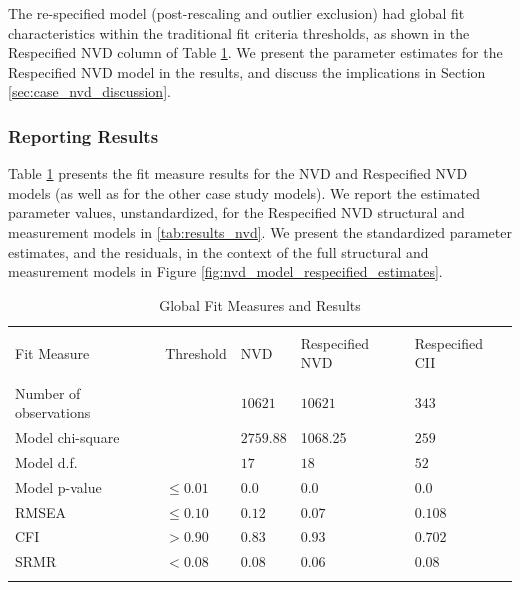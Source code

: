 The re-specified model (post-rescaling and outlier exclusion) had global fit characteristics within the traditional fit criteria thresholds, as shown in the Respecified NVD column of Table \ref{tab:results_fit_all}. We present the parameter estimates for the Respecified NVD model in the results, and discuss the implications in Section \ref{sec:case_nvd_discussion}.

\subsubsection{Reporting Results}
\label{sec:case_nvd_results}

Table \ref{tab:results_fit_all} presents the fit measure results for the NVD  and Respecified NVD models (as well as for the other case study models). We report the estimated parameter values, unstandardized, for the Respecified NVD structural and measurement models in \ref{tab:results_nvd}. We present the standardized parameter estimates, and the residuals, in the context of the full structural and measurement models in Figure \ref{fig:nvd_model_respecified_estimates}.

\begin{table}
	\begin{center}	
		\caption{Global Fit Measures and Results}
			\label{tab:results_fit_all}
			\begin{tabular}{p{3cm}p{1cm}|p{2cm}p{2cm}p{2cm}}
				\\[-1.8ex]\hline 
				\hline \\[-1.8ex] 
				Fit Measure & Threshold & NVD	& Respecified NVD & Respecified CII  \\
				\hline \\[-1.8ex] 				
				Number of observations &  & $10621$  & $10621$ & $343$  \\				
				Model chi-square &  & $2759.88$ & 1068.25 & $259$  \\				
				Model d.f. &  & $17$ & $18$ & $52$  \\		
				Model p-value & $\leq 0.01$ & $0.0$ & $0.0$ & $0.0$  \\
				RMSEA & $\leq 0.10$ &  $0.12$ &  $0.07$ & $0.108$   \\
				CFI & $> 0.90$ & $0.83$ & $0.93$  & $0.702$  \\
				SRMR & $< 0.08$ & $0.08$ & $0.06$ & $0.08$  \\
				\hline \\[-1.8ex] 				
			\end{tabular}
	\end{center}
\end{table}

